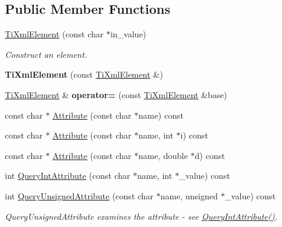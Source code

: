 \subsection*{Public Member Functions}
\begin{DoxyCompactItemize}
\item 
\mbox{\label{classTiXmlElement_a01bc3ab372d35da08efcbbe65ad90c60}} 
\hyperlink{classTiXmlElement_a01bc3ab372d35da08efcbbe65ad90c60}{Ti\+Xml\+Element} (const char $\ast$in\+\_\+value)
\begin{DoxyCompactList}\small\item\em Construct an element. \end{DoxyCompactList}\item 
\mbox{\label{classTiXmlElement_a1ca4465f3c2eac6a60e641cd7f1d9f7e}} 
{\bfseries Ti\+Xml\+Element} (const \hyperlink{classTiXmlElement}{Ti\+Xml\+Element} \&)
\item 
\mbox{\label{classTiXmlElement_ad58d300f4cfc0016ffa6861ebb718a0b}} 
\hyperlink{classTiXmlElement}{Ti\+Xml\+Element} \& {\bfseries operator=} (const \hyperlink{classTiXmlElement}{Ti\+Xml\+Element} \&base)
\item 
const char $\ast$ \hyperlink{classTiXmlElement_a6042f518748f475a7ac4b4e0b509eb05}{Attribute} (const char $\ast$name) const
\item 
const char $\ast$ \hyperlink{classTiXmlElement_a8005d0b808fd02bd1246710cdf95e5f6}{Attribute} (const char $\ast$name, int $\ast$i) const
\item 
const char $\ast$ \hyperlink{classTiXmlElement_a09df893402d0ab1402c8725e6d30ec04}{Attribute} (const char $\ast$name, double $\ast$d) const
\item 
int \hyperlink{classTiXmlElement_a5c0f739e0f6f5905a201364532e54a60}{Query\+Int\+Attribute} (const char $\ast$name, int $\ast$\+\_\+value) const
\item 
\mbox{\label{classTiXmlElement_ab75c83543d4ace62f4c40d7e8e392fc3}} 
int \hyperlink{classTiXmlElement_ab75c83543d4ace62f4c40d7e8e392fc3}{Query\+Unsigned\+Attribute} (const char $\ast$name, unsigned $\ast$\+\_\+value) const
\begin{DoxyCompactList}\small\item\em Query\+Unsigned\+Attribute examines the attribute -\/ see \hyperlink{classTiXmlElement_a5c0f739e0f6f5905a201364532e54a60}{Query\+Int\+Attribute()}. \end{DoxyCompactList}\item 

\end{DoxyCompactItemize}
